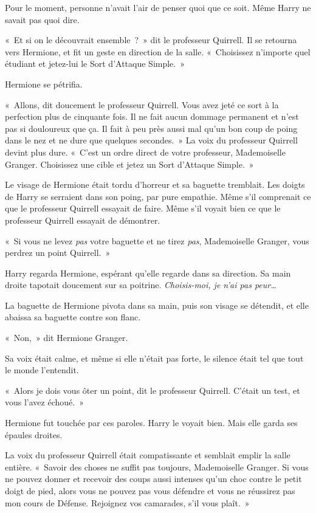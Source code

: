 Pour le moment, personne n'avait l'air de penser quoi que ce soit. Même Harry ne savait pas quoi dire.

«~Et si on le découvrait ensemble~?~» dit le professeur Quirrell. Il se retourna vers Hermione, et fit un geste en direction de la salle. «~Choisissez n'importe quel étudiant et jetez-lui le Sort d'Attaque Simple.~»

Hermione se pétrifia.

«~Allons, dit doucement le professeur Quirrell. Vous avez jeté ce sort à la perfection plus de cinquante fois. Il ne fait aucun dommage permanent et n'est pas si douloureux que ça. Il fait à peu près aussi mal qu'un bon coup de poing dans le nez et ne dure que quelques secondes.~» La voix du professeur Quirrell devint plus dure. «~C'est un ordre direct de votre professeur, Mademoiselle Granger. Choisissez une cible et jetez un Sort d'Attaque Simple.~»

Le visage de Hermione était tordu d'horreur et sa baguette tremblait. Les doigts de Harry se serraient dans son poing, par pure empathie. Même s'il comprenait ce que le professeur Quirrell essayait de faire. Même s'il voyait bien ce que le professeur Quirrell essayait de démontrer.

«~Si vous ne levez \emph{pas} votre baguette et ne tirez \emph{pas}, Mademoiselle Granger, vous perdrez un point Quirrell.~»

Harry regarda Hermione, espérant qu'elle regarde dans sa direction. Sa main droite tapotait doucement sur sa poitrine. \emph{Choisis-moi, je n'ai pas peur…}

La baguette de Hermione pivota dans sa main, puis son visage se détendit, et elle abaissa sa baguette contre son flanc.

«~Non,~» dit Hermione Granger.

Sa voix était calme, et même si elle n'était pas forte, le silence était tel que tout le monde l'entendit.

«~Alors je dois vous ôter un point, dit le professeur Quirrell. C'était un test, et vous l'avez échoué.~»

Hermione fut touchée par ces paroles. Harry le voyait bien. Mais elle garda ses épaules droites.

La voix du professeur Quirrell était compatissante et semblait emplir la salle entière. «~Savoir des choses ne suffit pas toujours, Mademoiselle Granger. Si vous ne pouvez donner et recevoir des coups aussi intenses qu'un choc contre le petit doigt de pied, alors vous ne pouvez pas vous défendre et vous ne réussirez pas mon cours de Défense. Rejoignez vos camarades, s'il vous plaît.~»

